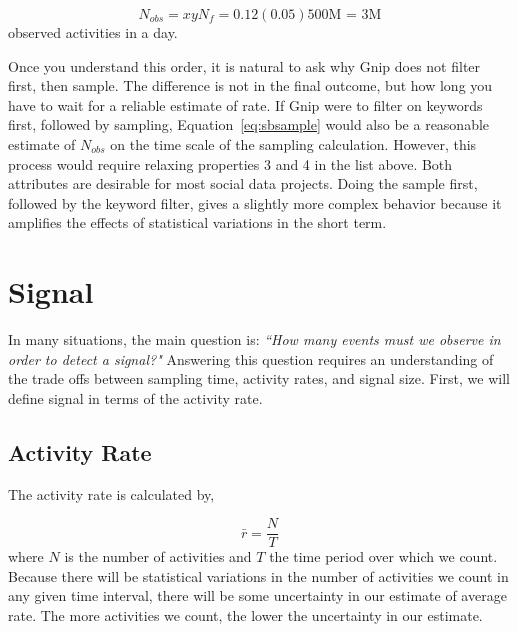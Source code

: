 \documentclass{article}
\begin{document}
\begin{equation}
    \label{eq:sbsample}
    N_{obs} = x y N_f = 0.12 (0.05) 500 \textrm{M = 3M}
\end{equation}
observed activities in a day. 

Once you understand this order, it is natural to ask why Gnip does not filter first, then sample. The difference is not in the final outcome, but how long you have to wait for a reliable estimate of rate. If Gnip were to filter on keywords first, followed by sampling, Equation~\ref{eq:sbsample} would also be a reasonable estimate of $N_{obs}$ on the time scale of the sampling calculation. However, this process would require relaxing properties 3 and 4 in the list above. Both attributes are desirable for most social data projects. Doing the sample first, followed by the keyword filter, gives a slightly more complex behavior because it amplifies the effects of statistical variations in the short term.

\section{Signal} 

In many situations, the main question is: \emph{``How many events must we observe in order to detect a signal?"} Answering this question requires an understanding of the trade offs between sampling time, activity rates, and signal size.  First, we will define signal in terms of the activity rate.

\subsection{Activity Rate} 

The activity rate is calculated by,

\begin{equation}
    \label{eq:rateEst}
    \bar{r} = \frac{N}{T}
\end{equation}
where $N$ is the number of activities and $T$ the time period over which we count.  Because there will be statistical variations in the number of activities we count in any given time interval, there will be some uncertainty in our estimate of average rate. The more activities we count, the lower the uncertainty in our estimate.
\end{document}
